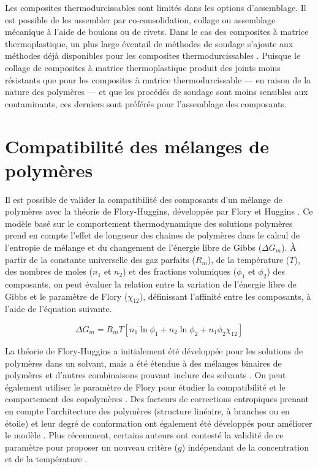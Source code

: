 Les composites thermodurcissables sont limités dans les options d'assemblage. 
Il est possible de les assembler par co-consolidation, collage ou assemblage mécanique à l'aide de boulons ou de rivets.
Dans le cas des composites à matrice thermoplastique, un plus large éventail de méthodes de soudage s'ajoute aux méthodes déjà disponibles pour les composites thermodurcissables \cite{campbell2003}. 
Puisque le collage de composites à matrice thermoplastique produit des joints moins résistants que pour les composites à matrice thermodurcissable --- en raison de la nature des polymères \cite{campbell2003} --- et que les procédés de soudage sont moins sensibles aux contaminants, ces derniers sont préférés pour l'assemblage des composants. 

\section{Compatibilité des mélanges de polymères}

Il est possible de valider la compatibilité des composants d'un mélange de polymères avec la théorie de Flory-Huggins, développée par Flory \cite{Flory1941} et Huggins \cite{Huggins1941}. 
Ce modèle basé sur le comportement thermodynamique des solutions polymères prend en compte l'effet de longueur des chaines de polymères dans le calcul de l'entropie de mélange et du changement de l'énergie libre de Gibbs ($\Delta G_m$). 
À partir de la constante universelle des gaz parfaits ($R_m$), de la température ($T$), des nombres de moles ($n_1$ et $n_2$) et des fractions volumiques ($\phi_1$ et $\phi_2$) des composants, on peut évaluer la relation entre la variation de l'énergie libre de Gibbs et le paramètre de Flory ($\chi_{12}$), définissant l'affinité entre les composants, à l'aide de l'équation suivante.

\begin{equation}
\Delta G_m = R_m T \left[ n_1 \ln \phi_1 + n_2 \ln \phi_2 + n_1 \phi_2 \chi_{12} \right]
\end{equation}

La théorie de Flory-Huggins a initialement été développée pour les solutions de polymères dans un solvant, mais a été étendue à des mélanges binaires de polymères et d'autres combinaisons pouvant inclure des solvants \cite{Huggins1942a,Scott1949,Fredrickson1994c}. 
On peut également utiliser le paramètre de Flory pour étudier la compatibilité et le comportement des copolymères \cite{Scott1952c}. 
Des facteurs de corrections entropiques prenant en compte l'architecture des polymères (structure linéaire, à branches ou en étoile) et leur degré de conformation ont également été développés pour améliorer le modèle \cite{Fredrickson1994c}. 
Plus récemment, certains auteurs ont contesté la validité de ce paramètre pour proposer un nouveau critère ($g$) indépendant de la concentration et de la température \cite{Tambasco2006c,Higgins2010c,White2012c}. 

